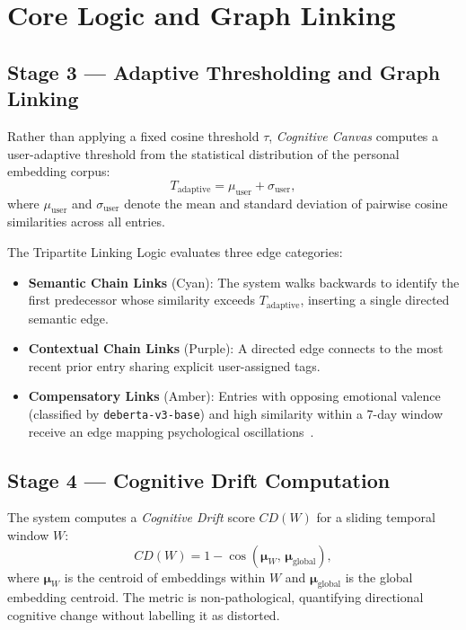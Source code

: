 \documentclass[12pt]{article}
\newcommand{\CC}{\textit{Cognitive Canvas}}
\begin{document}
\section{Core Logic and Graph Linking}

\subsection{Stage 3 --- Adaptive Thresholding and Graph Linking}
Rather than applying a fixed cosine threshold $\tau$, \CC{} computes a user-adaptive threshold from the statistical distribution of the personal embedding corpus:
\begin{equation}
T_{\mathrm{adaptive}} = \mu_{\mathrm{user}} + \sigma_{\mathrm{user}},
\label{eq:adaptive}
\end{equation}
where $\mu_{\mathrm{user}}$ and $\sigma_{\mathrm{user}}$ denote the mean and standard deviation of pairwise cosine similarities across all entries. 

The Tripartite Linking Logic evaluates three edge categories:
\begin{itemize}
    \item \textbf{Semantic Chain Links} (Cyan): The system walks backwards to identify the first predecessor whose similarity exceeds $T_{\mathrm{adaptive}}$, inserting a single directed semantic edge.
    \item \textbf{Contextual Chain Links} (Purple): A directed edge connects to the most recent prior entry sharing explicit user-assigned tags.
    \item \textbf{Compensatory Links} (Amber): Entries with opposing emotional valence (classified by \texttt{deberta-v3-base}) and high similarity within a 7-day window receive an edge mapping psychological oscillations~\cite{he2021deberta}.
\end{itemize}

\subsection{Stage 4 --- Cognitive Drift Computation}
The system computes a \emph{Cognitive Drift} score $CD(W)$ for a sliding temporal window $W$:
\begin{equation}
CD(W) = 1 - \cos\!\left(\boldsymbol{\mu}_W,\, \boldsymbol{\mu}_{\mathrm{global}}\right),
\label{eq:drift}
\end{equation}
where $\boldsymbol{\mu}_W$ is the centroid of embeddings within $W$ and $\boldsymbol{\mu}_{\mathrm{global}}$ is the global embedding centroid. The metric is non-pathological, quantifying directional cognitive change without labelling it as distorted.
\end{document}
